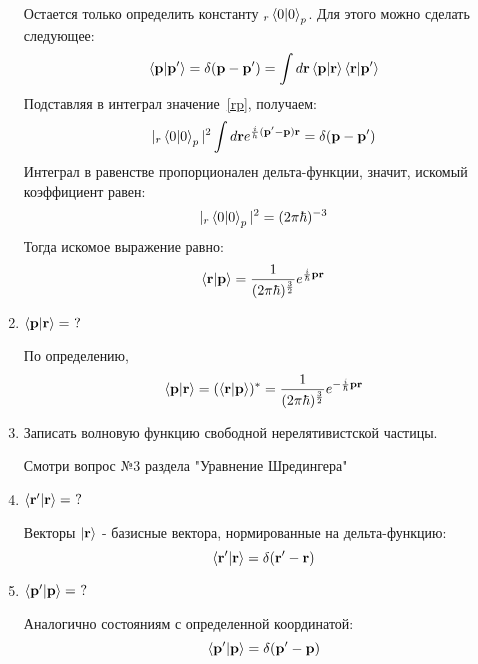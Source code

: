 \documentclass{article}
\begin{document}
\begin{enumerate}
\begin{equation}
	\end{equation}
	Остается только определить константу $_r\braket{0|0}_p$. Для этого можно сделать следующее:
	\begin{equation}
		\braket{\textbf{p}|\textbf{p}'} = \delta(\textbf{p} - \textbf{p}') = \int d\textbf{r} \braket{\textbf{p}|\textbf{r}}\braket{\textbf{r}|\textbf{p}'}
	\end{equation}
	Подставляя в интеграл значение~\eqref{rp}, получаем:
	\begin{equation}
		|_r\braket{0|0}_p|^2 \int d\textbf{r} e^{\frac{i}{h}(\textbf{p}' - \textbf{p})\textbf{r}} = \delta(\textbf{p} - \textbf{p}')
	\end{equation}
	Интеграл в равенстве пропорционален дельта-функции, значит, искомый коэффициент равен:
	\begin{equation}
		|_r\braket{0|0}_p|^2 = (2\pi\hbar)^{-3}
	\end{equation}
	Тогда искомое выражение равно:
	\begin{equation}
		\braket{\textbf{r}|\textbf{p}} = \frac{1}{(2\pi\hbar)^{\frac{3}{2}}} e^{\frac{i}{\hbar}\textbf{pr}}
	\end{equation}
	
	\item $\braket{\textbf{p}|\textbf{r}} = \ ?$
		
	По определению,
	\begin{equation}
		\braket{\textbf{p}|\textbf{r}} = (\braket{\textbf{r}|\textbf{p}})^* = \frac{1}{(2\pi\hbar)^{\frac{3}{2}}} e^{-\frac{i}{\hbar}\textbf{pr}}
	\end{equation}
	
	\item {Записать волновую функцию свободной нерелятивистской частицы.}
	
	Смотри вопрос №3 раздела "Уравнение Шредингера"
	\item $\braket{\textbf{r}'|\textbf{r}} = \ ?$
	
	Векторы $\ket{\textbf{r}}$ - базисные вектора, нормированные на дельта-функцию:
	\begin{equation}
		\braket{\textbf{r}'|\textbf{r}} = \delta(\textbf{r}' - \textbf{r})
	\end{equation}
	
	\item $\braket{\textbf{p}'|\textbf{p}} = \ ?$
	
	Аналогично состояниям с определенной координатой:
	\begin{equation}
		\braket{\textbf{p}'|\textbf{p}} = \delta(\textbf{p}' - \textbf{p})	
	\end{equation}
	

\end{enumerate}
\end{document}
